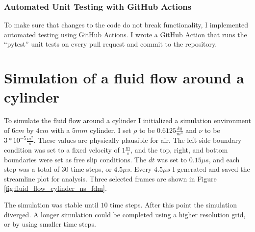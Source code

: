 \subsubsection{Automated Unit Testing with GitHub Actions}
To make sure that changes to the code do not break functionality, I implemented automated testing using GitHub Actions.
I wrote a GitHub Action that runs the ``pytest'' unit tests on every pull request and commit to the repository.

\section{Simulation of a fluid flow around a cylinder}

To simulate the fluid flow around a cylinder I initialized a simulation environment of $6cm$ by $4cm$ with a $5mm$ cylinder. I set $\rho$ to be $0.6125 \frac{kg}{m^3}$ and $\nu$ to be $3 * 10^{-5} \frac{m^2}{s}$. These values are physically plausible for air. The left side boundary condition was set to a fixed velocity of $1 \frac{m}{s}$, and the top, right, and bottom boundaries were set as free slip conditions. The $dt$ was set to $0.15 \mu s$, and each step was a total of $30$ time steps, or $4.5 \mu s$. Every $4.5 \mu s$ I generated and saved the streamline plot for analysis. Three selected frames are shown in Figure \ref{fig:fluid_flow_cylinder_ns_fdm}.

The simulation was stable until $10$ time steps. After this point the simulation diverged. A longer simulation could be completed using a higher resolution grid, or by using smaller time steps.


